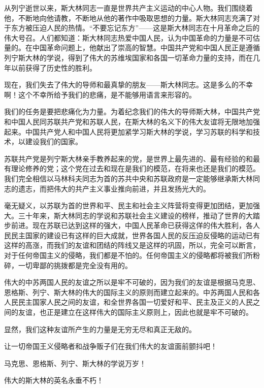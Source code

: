 从列宁逝世以来，斯大林同志一直是世界共产主义运动的中心人物。我们围绕着他，不断地向他请教，不断地从他的著作中吸取思想的力量。斯大林同志充满了对于东方被压迫人民的热情。“不要忘记东方”——这是斯大林同志在十月革命之后的伟大号召。人们都知道：斯大林同志热爱中国人民，认为中国革命的力量是不可估量的。在中国革命问题上，他献出了崇高的智慧。中国共产党和中国人民正是遵循列宁斯大林的学说，得到了伟大的苏维埃国家和各国一切革命力量的支持，而在几年以前获得了历史性的胜利。

现在，我们失去了伟大的导师和最真挚的朋友——斯大林同志。这是多么的不幸啊！这个不幸所给予我们的悲痛，是不能够用语言来形容的。

我们的任务是要把悲痛化为力量。为着纪念我们的伟大的导师斯大林，中国共产党和中国人民同苏联共产党和苏联人民，在斯大林的名义下的伟大友谊将无限地加强起来。中国共产党人和中国人民将更加紧学习斯大林的学说，学习苏联的科学和技术，以建设我们的国家。

苏联共产党是列宁斯大林亲手教养起来的党，是世界上最先进的、最有经验的和最有理论修养的党；这个党在过去和现在是我们的模范，在将来也还是我们的模范。我们完全相信以马林科夫同志为首的苏共中央和苏联政府是一定能够继承斯大林同志的遗志，而把伟大的共产主义事业推向前进，并且发扬光大的。

毫无疑义，以苏联为首的世界和平、民主和社会主义阵营将变得更加团结，更加强大。三十年来，斯大林同志的学说和苏联社会主义建设的榜样，推动了世界的大踏步前进。现在苏联已达到这样的强大，中国人民革命已获得这佯的伟大胜利，各人民民主国家的建设已有这样的巨大成就，世界各国人民的反压迫反侵略的运动已有这样的高涨，而我们的友谊和团结的阵线又是这样的巩固，所以，完全可以断言，对于任何帝国主义的侵略，我们都是不怕的。任何帝国主义的侵略都将被我们所粉碎，一切卑鄙的挑拨都是完全没有用的。

伟大的中苏两国人民的友谊之所以是牢不可破的，因为我们的友谊是根据马克思、恩格斯、列宁、斯大林的伟大的国际主义的原则而建立起来的。中苏两国人民和各人民民主国家人民之间的友谊，和全世界各国一切爱好和平、民主及正义的人民之间的友谊，也正是建立在这样伟大的国际主义原则上，因此也就是牢不可破的。

显然，我们这种友谊所产生的力量是无穷无尽和真正无敌的。

让一切帝国王义侵略者和战争贩子们在我们伟大的友谊面前颤抖吧！

马克思、恩格斯、列宁、斯大林的学说万岁！

伟大的斯大林的英名永垂不朽！


